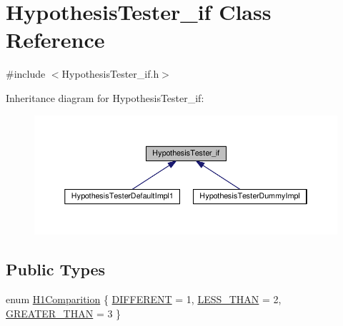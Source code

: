 \hypertarget{class_hypothesis_tester__if}{}\section{Hypothesis\+Tester\+\_\+if Class Reference}
\label{class_hypothesis_tester__if}


{\ttfamily \#include $<$Hypothesis\+Tester\+\_\+if.\+h$>$}



Inheritance diagram for Hypothesis\+Tester\+\_\+if\+:
\nopagebreak
\begin{figure}[H]
\begin{center}
\leavevmode
\includegraphics[width=350pt]{class_hypothesis_tester__if__inherit__graph}
\end{center}
\end{figure}
\subsection*{Public Types}
\begin{DoxyCompactItemize}
\item 
enum \hyperlink{class_hypothesis_tester__if_a89153ff990252f9f79856a2f2532c349}{H1\+Comparition} \{ \hyperlink{class_hypothesis_tester__if_a89153ff990252f9f79856a2f2532c349acf8c0147414ce2a7cfdc8b26854464f8}{D\+I\+F\+F\+E\+R\+E\+NT} = 1, 
\hyperlink{class_hypothesis_tester__if_a89153ff990252f9f79856a2f2532c349a58aba9f031dcbe91654e790416d84969}{L\+E\+S\+S\+\_\+\+T\+H\+AN} = 2, 
\hyperlink{class_hypothesis_tester__if_a89153ff990252f9f79856a2f2532c349ad0539d107f27b07e600a3c46da5b1934}{G\+R\+E\+A\+T\+E\+R\+\_\+\+T\+H\+AN} = 3
 \}
\end{DoxyCompactItemize}
